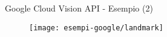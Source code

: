 %
\begin{frame}[t]{Google Cloud Vision API - Esempio (2)}
	\begin{figure}[h]
	\centering
	    \texttt{[image: esempi-google/landmark]}
		\label{fig:esempio-google-2}
	\end{figure}
\end{frame}
%
